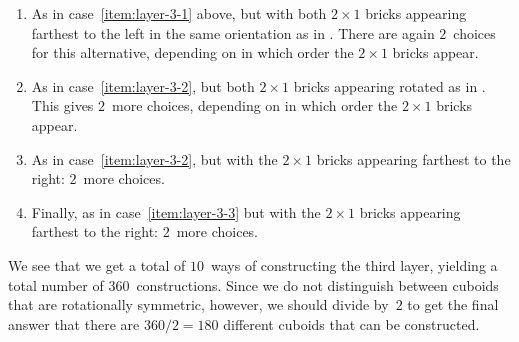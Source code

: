\documentclass{jn-pset}
\begin{document}
\begin{problem}
\begin{solution}
\begin{enumerate}
  \item 
    \label{item:layer-3-2}
    As in 
    case~\ref{item:layer-3-1}
    above, but with both $2 \times 1$ bricks appearing farthest to the left
    in the same orientation as in .
    There are  again
    $2$~choices for this
    alternative, depending on in which order the
    $2 \times 1$ bricks appear.


  \item 
    \label{item:layer-3-3}
    As in 
    case~\ref{item:layer-3-2},
    but both $2 \times 1$ bricks appearing rotated as in
    .
    This gives 
    $2$~more choices, depending on in which order the
    $2 \times 1$ bricks appear.

  \item 
    \label{item:layer-3-4}
    As in 
    case~\ref{item:layer-3-2},
    but with the
    $2 \times 1$ bricks appearing farthest to the right:
    $2$~more choices.


  \item 
    \label{item:layer-3-5}
    Finally, as in 
    case~\ref{item:layer-3-3}
    but with the
    $2 \times 1$ bricks appearing farthest to the right:
    $2$~more choices.

  \end{enumerate}
  We see that we get a total of $10$~ways of constructing the third layer, 
  yielding a total number of $360$~constructions.
  Since we do not distinguish between cuboids that are rotationally
  symmetric,  however,
  we should divide by~$2$ to get the final answer 
  that there are $360 / 2 = 180$
  different cuboids that can be constructed.
\end{solution}

{}
{}

\end{problem}
\end{document}
